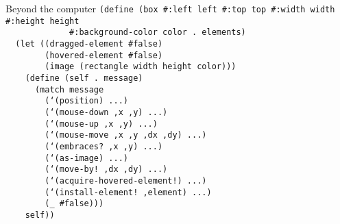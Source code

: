\begin{frame}{Beyond the computer}
  \tiny
  \texttt{(define (box \#:left left \#:top top \#:width width \#:height height\\
    \ \ \ \ \ \ \ \ \ \ \ \ \ \#:background-color color .\ elements)\\
    \ \ (let ((dragged-element \#false)\\
    \ \ \ \ \ \ \ \ (hovered-element \#false)\\
    \ \ \ \ \ \ \ \ (image (rectangle width height color)))\\
    \ \ \ \ (define (self .\ message)\\
    \ \ \ \ \ \ (match message\\
    \ \ \ \ \ \ \ \ (`(position) ...)\\
    \ \ \ \ \ \ \ \ (`(mouse-down ,x ,y) ...)\\
    \ \ \ \ \ \ \ \ (`(mouse-up ,x ,y) ...)\\
    \ \ \ \ \ \ \ \ (`(mouse-move ,x ,y ,dx ,dy) ...)\\
    \ \ \ \ \ \ \ \ (`(embraces?\ ,x ,y) ...)\\
    \ \ \ \ \ \ \ \ (`(as-image) ...)\\
    \ \ \ \ \ \ \ \ (`(move-by!\ ,dx ,dy) ...)\\
    \ \ \ \ \ \ \ \ (`(acquire-hovered-element!) ...)\\
    \ \ \ \ \ \ \ \ (`(install-element!\ ,element) ...)\\
    \ \ \ \ \ \ \ \ (\_ \#false)))\\
    \ \ \ \ self))} \\
  \ \\ \ \\ \ \\ \ \\ \ \\ \ \\ \ \\ \ \\ \ \\ \ \\ \ 
\end{frame}


